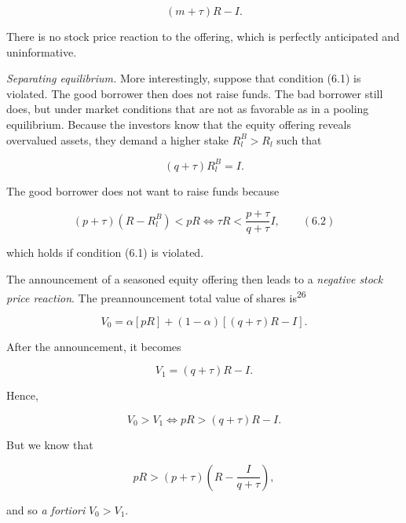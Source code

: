 \documentclass[11pt,a4paper]{article}
\begin{document}
\[(m + \tau)R - I.\]

There is no stock price reaction to the offering, which is perfectly anticipated and uninformative.

\emph{Separating equilibrium.} More interestingly, suppose that condition (6.1) is violated. The
good borrower then does not raise funds. The bad borrower still does, but under market conditions
that are not as favorable as in a pooling equilibrium. Because the investors know that the equity
offering reveals overvalued assets, they demand a higher stake \(R_l^B > R_l\) such that

\[(q + \tau)R_l^B = I.\]

The good borrower does not want to raise funds because

\[(p + \tau)(R - R_l^B) < pR \iff \tau R < \frac{p + \tau}{q + \tau} I, \qquad (6.2)\]

which holds if condition (6.1) is violated.

The announcement of a seasoned equity offering then leads to a \emph{negative stock price reaction}.
The preannouncement total value of shares is\textsuperscript{26}

\[V_0 = \alpha[pR] + (1 - \alpha)[(q + \tau)R - I].\]

After the announcement, it becomes

\[V_1 = (q + \tau)R - I.\]

Hence,

\[V_0 > V_1 \iff pR > (q + \tau)R - I.\]

But we know that

\[pR > (p + \tau)\left(R - \frac{I}{q + \tau}\right),\]

and so \emph{a fortiori} \(V_0 > V_1\).
\end{document}
